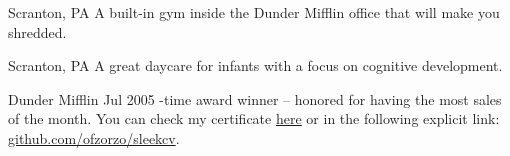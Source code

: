\documentclass{sleekcv}%
\begin{document}
\begin{bodycol}
	\begin{bodysection}[PROJECTS]%
		{Scranton, PA}
		{}
		{}
		{}
		\bodytext
		A built-in gym inside the Dunder Mifflin office that will make you shredded.

		\newpage{}
		{Scranton, PA}
		{}
		{}
		{}
		\bodytext
		A great daycare for infants with a focus on cognitive development.
	\end{bodysection}

	\begin{bodysection}[AWARDS]%
		{Dunder Mifflin}
		{Jul 2005}
		{}
		{}
		-time award winner – honored for having the most sales of the month. You can check my certificate \underline{\href{https://github.com/ofzorzo/sleekcv}{here}} or in the following explicit link: \href{https://github.com/ofzorzo/sleekcv}{github.com/ofzorzo/sleekcv}.
	\end{bodysection}

\end{bodycol}
\end{document}
